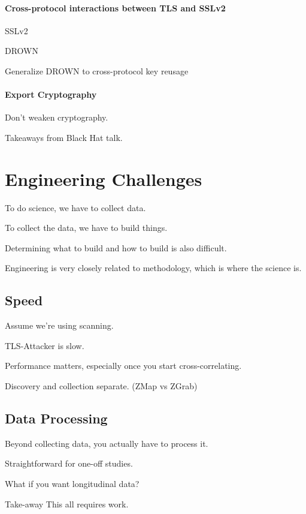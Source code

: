 \paragraph{Cross-protocol interactions between TLS and SSLv2}

SSLv2

DROWN

Generalize DROWN to cross-protocol key reusage

\paragraph{Export Cryptography}
Don't weaken cryptography.

Takeaways from Black Hat talk.

\section{Engineering Challenges}

To do science, we have to collect data.

To collect the data, we have to build things.

Determining what to build and how to build is also difficult.

Engineering is very closely related to methodology, which is where the science is.

\subsection{Speed}

Assume we're using scanning.

TLS-Attacker is slow.

Performance matters, especially once you start cross-correlating.

Discovery and collection separate. (ZMap vs ZGrab)

\subsection{Data Processing}

Beyond collecting data, you actually have to process it.

Straightforward for one-off studies.

What if you want longitudinal data?

Take-away This all requires work.

